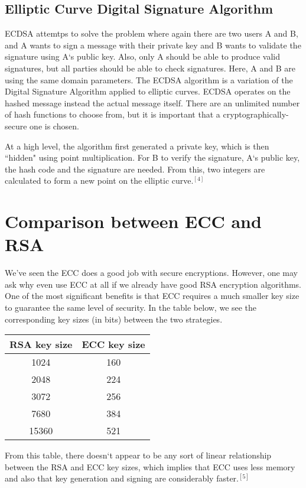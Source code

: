 \documentclass[conference]{IEEEtran}
\begin{document}
\subsection{Elliptic Curve Digital Signature Algorithm}
ECDSA attemtps to solve the problem where again there are two users A and B, and A wants to sign a message with their private key and B wants to validate the signature using A`s public key.  Also, only A should be able to produce valid signatures, but all parties should be able to check signatures.  Here, A and B are using the same domain parameters.  The ECDSA algorithm is a variation of the Digital Signature Algorithm applied to elliptic curves.  ECDSA operates on the hashed message instead the actual message itself.  There are an unlimited number of hash functions to choose from, but it is important that a cryptographically-secure one is chosen.  

At a high level, the algorithm first generated a private key, which is then ``hidden" using point multiplication.  For B to verify the signature, A`s public key, the hash code and the signature are needed.  From this, two integers are calculated to form a new point on the elliptic curve.$^{[4]}$  

\section{Comparison between ECC and RSA}
We've seen the ECC does a good job with secure encryptions.  However, one may ask why even use ECC at all if we already have good RSA encryption algorithms.  One of the most significant benefits is that ECC requires a much smaller key size to guarantee the same level of security.  In the table below, we see the corresponding key sizes (in bits) between the two strategies.  

\begin{center}
\begin{tabular}{ |c|c| } 
\hline
RSA key size & ECC key size \\
\hline
1024 & 160  \\ 
2048 & 224  \\ 
3072 & 256  \\ 
7680 & 384  \\ 
15360 & 521  \\ 
\hline
\end{tabular}
\end{center}

From this table, there doesn`t appear to be any sort of linear relationship between the RSA and ECC key sizes, which implies that ECC uses less memory and also that key generation and signing are considerably faster.$^{[5]}$  
\end{document}
